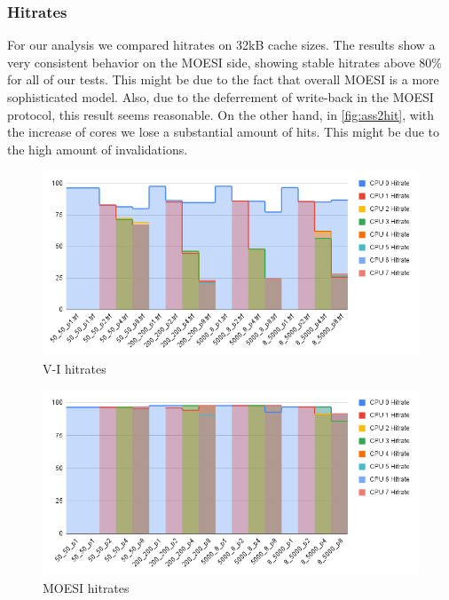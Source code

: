 \subsubsection{Hitrates}
For our analysis we compared hitrates on 32kB cache sizes. The results show a very consistent behavior on the MOESI side, showing stable hitrates above 80\% for all of our tests. This might be due to the fact that overall MOESI is a more sophisticated model. Also, due to the deferrement of write-back in the MOESI protocol, this result seems reasonable. On the other hand, in \autoref{fig:ass2hit}, with the increase of cores we lose a substantial amount of hits. This might be due to the high amount of invalidations.
\begin{figure}[H]
    \centering
    \includegraphics[scale=0.4]{Figures/ass2_hitrates.png}
    \caption{V-I hitrates}
    \label{fig:ass2hit}
\end{figure}
\begin{figure}
    \centering
    \includegraphics[scale=0.4]{Figures/ass3_hitrates.png}
    \caption{MOESI hitrates}
    \label{fig:ass3hit}
\end{figure}


